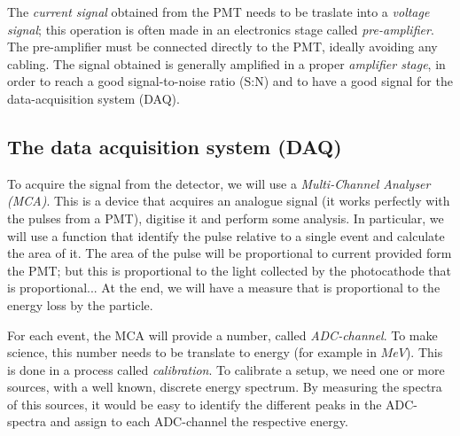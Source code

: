 \documentclass[a4,11pt, notitlepage]{article}
\begin{document}
The \emph{current signal} obtained from the PMT needs to be traslate into a \emph{voltage signal}; this operation is often made in an electronics stage called \emph{pre-amplifier}. The pre-amplifier must be connected directly to the PMT, ideally avoiding any cabling. 
The signal obtained is generally amplified in a proper \emph{amplifier stage}, in order to reach a good signal-to-noise ratio (S:N) and to have a good signal for the data-acquisition system (DAQ).

%

\subsection{The data acquisition system (DAQ)}

To acquire the signal from the detector, we will use a \emph{Multi-Channel Analyser (MCA)}. 
This is a device that acquires an analogue signal (it works perfectly with the pulses from a PMT), digitise it and perform some analysis. 
In particular, we will use a function that identify the pulse relative to a single event and calculate the area of it. 
The area of the pulse will be proportional to current provided form the PMT; but this is proportional to the light collected by the photocathode that is proportional... 
At the end, we will have a measure that is proportional to the energy loss by the particle. 

For each event, the MCA will provide a number, called \emph{ADC-channel}. 
To make science, this number needs to be translate to energy (for example in $MeV$). 
This is done in a process called \emph{calibration}. 
To calibrate a setup, we need one or more sources, with a well known, discrete energy spectrum. 
By measuring the spectra of this sources, it would be easy to identify the different peaks in the ADC-spectra and assign to each ADC-channel the respective energy. 
\end{document}
